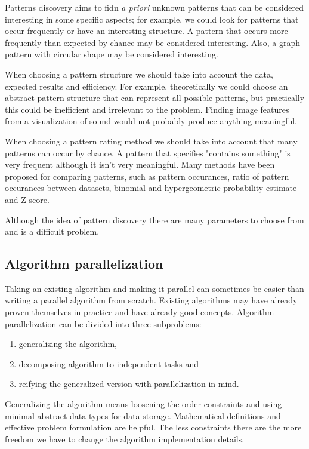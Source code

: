 Patterns discovery aims to fidn \emph{a priori} unknown patterns that can be considered interesting in some specific aspects; for example, we could look for patterns that occur frequently or have an interesting structure. A pattern that occurs more frequently than expected by chance may be considered interesting. Also, a graph pattern with circular shape may be considered interesting.

When choosing a pattern structure we should take into account the data, expected results and efficiency. For example, theoretically we could choose an abstract pattern structure that can represent all possible patterns, but practically this could be inefficient and irrelevant to the problem. Finding image features from a visualization of sound would not probably produce anything meaningful.

When choosing a pattern rating method we should take into account that many patterns can occur by chance. \hmm A pattern that specifies "contains something" is very frequent although it isn't very meaningful. Many methods have been proposed for comparing patterns, such as pattern occurances, ratio of pattern occurances between datasets, binomial and hypergeometric probability estimate and Z-score.\insertref

Although the idea of pattern discovery there are many parameters to choose from and is a difficult problem.

\subsection{Algorithm parallelization}

Taking an existing algorithm and making it parallel can sometimes be easier than writing a parallel algorithm from scratch. Existing algorithms may have already proven themselves in practice and have already good concepts\hmm. Algorithm parallelization can be divided into three subproblems:

\begin{enumerate}
	\item generalizing the algorithm,
	\item decomposing algorithm to independent tasks and
	\item reifying the generalized version with parallelization in mind.
\end{enumerate}

Generalizing the algorithm means loosening the order constraints and using minimal abstract data types for data storage. Mathematical definitions and effective problem formulation are helpful. The less constraints there are the more freedom we have to change the algorithm implementation details.

